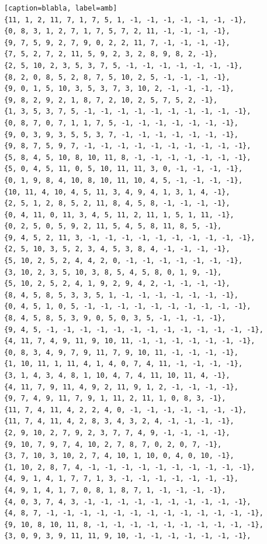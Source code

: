 \documentclass[12pt]{article}
\begin{document}
\begin{lstlisting}[frame=single, basicstyle=\scriptsize][caption=blabla, label=amb]
{11, 1, 2, 11, 7, 1, 7, 5, 1, -1, -1, -1, -1, -1, -1, -1},
{0, 8, 3, 1, 2, 7, 1, 7, 5, 7, 2, 11, -1, -1, -1, -1},
{9, 7, 5, 9, 2, 7, 9, 0, 2, 2, 11, 7, -1, -1, -1, -1},
{7, 5, 2, 7, 2, 11, 5, 9, 2, 3, 2, 8, 9, 8, 2, -1},
{2, 5, 10, 2, 3, 5, 3, 7, 5, -1, -1, -1, -1, -1, -1, -1},
{8, 2, 0, 8, 5, 2, 8, 7, 5, 10, 2, 5, -1, -1, -1, -1},
{9, 0, 1, 5, 10, 3, 5, 3, 7, 3, 10, 2, -1, -1, -1, -1},
{9, 8, 2, 9, 2, 1, 8, 7, 2, 10, 2, 5, 7, 5, 2, -1},
{1, 3, 5, 3, 7, 5, -1, -1, -1, -1, -1, -1, -1, -1, -1, -1},
{0, 8, 7, 0, 7, 1, 1, 7, 5, -1, -1, -1, -1, -1, -1, -1},
{9, 0, 3, 9, 3, 5, 5, 3, 7, -1, -1, -1, -1, -1, -1, -1},
{9, 8, 7, 5, 9, 7, -1, -1, -1, -1, -1, -1, -1, -1, -1, -1},
{5, 8, 4, 5, 10, 8, 10, 11, 8, -1, -1, -1, -1, -1, -1, -1},
{5, 0, 4, 5, 11, 0, 5, 10, 11, 11, 3, 0, -1, -1, -1, -1},
{0, 1, 9, 8, 4, 10, 8, 10, 11, 10, 4, 5, -1, -1, -1, -1},
{10, 11, 4, 10, 4, 5, 11, 3, 4, 9, 4, 1, 3, 1, 4, -1},
{2, 5, 1, 2, 8, 5, 2, 11, 8, 4, 5, 8, -1, -1, -1, -1},
{0, 4, 11, 0, 11, 3, 4, 5, 11, 2, 11, 1, 5, 1, 11, -1},
{0, 2, 5, 0, 5, 9, 2, 11, 5, 4, 5, 8, 11, 8, 5, -1},
{9, 4, 5, 2, 11, 3, -1, -1, -1, -1, -1, -1, -1, -1, -1, -1},
{2, 5, 10, 3, 5, 2, 3, 4, 5, 3, 8, 4, -1, -1, -1, -1},
{5, 10, 2, 5, 2, 4, 4, 2, 0, -1, -1, -1, -1, -1, -1, -1},
{3, 10, 2, 3, 5, 10, 3, 8, 5, 4, 5, 8, 0, 1, 9, -1},
{5, 10, 2, 5, 2, 4, 1, 9, 2, 9, 4, 2, -1, -1, -1, -1},
{8, 4, 5, 8, 5, 3, 3, 5, 1, -1, -1, -1, -1, -1, -1, -1},
{0, 4, 5, 1, 0, 5, -1, -1, -1, -1, -1, -1, -1, -1, -1, -1},
{8, 4, 5, 8, 5, 3, 9, 0, 5, 0, 3, 5, -1, -1, -1, -1},
{9, 4, 5, -1, -1, -1, -1, -1, -1, -1, -1, -1, -1, -1, -1, -1},
{4, 11, 7, 4, 9, 11, 9, 10, 11, -1, -1, -1, -1, -1, -1, -1},
{0, 8, 3, 4, 9, 7, 9, 11, 7, 9, 10, 11, -1, -1, -1, -1},
{1, 10, 11, 1, 11, 4, 1, 4, 0, 7, 4, 11, -1, -1, -1, -1},
{3, 1, 4, 3, 4, 8, 1, 10, 4, 7, 4, 11, 10, 11, 4, -1},
{4, 11, 7, 9, 11, 4, 9, 2, 11, 9, 1, 2, -1, -1, -1, -1},
{9, 7, 4, 9, 11, 7, 9, 1, 11, 2, 11, 1, 0, 8, 3, -1},
{11, 7, 4, 11, 4, 2, 2, 4, 0, -1, -1, -1, -1, -1, -1, -1},
{11, 7, 4, 11, 4, 2, 8, 3, 4, 3, 2, 4, -1, -1, -1, -1},
{2, 9, 10, 2, 7, 9, 2, 3, 7, 7, 4, 9, -1, -1, -1, -1},
{9, 10, 7, 9, 7, 4, 10, 2, 7, 8, 7, 0, 2, 0, 7, -1},
{3, 7, 10, 3, 10, 2, 7, 4, 10, 1, 10, 0, 4, 0, 10, -1},
{1, 10, 2, 8, 7, 4, -1, -1, -1, -1, -1, -1, -1, -1, -1, -1},
{4, 9, 1, 4, 1, 7, 7, 1, 3, -1, -1, -1, -1, -1, -1, -1},
{4, 9, 1, 4, 1, 7, 0, 8, 1, 8, 7, 1, -1, -1, -1, -1},
{4, 0, 3, 7, 4, 3, -1, -1, -1, -1, -1, -1, -1, -1, -1, -1},
{4, 8, 7, -1, -1, -1, -1, -1, -1, -1, -1, -1, -1, -1, -1, -1},
{9, 10, 8, 10, 11, 8, -1, -1, -1, -1, -1, -1, -1, -1, -1, -1},
{3, 0, 9, 3, 9, 11, 11, 9, 10, -1, -1, -1, -1, -1, -1, -1},

\end{lstlisting}
\end{document}
